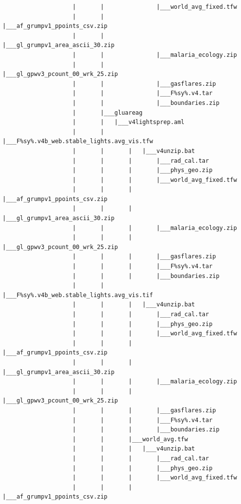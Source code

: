 \documentclass[
]{book}
\begin{document}
\begin{verbatim}
                    |       |               |___world_avg_fixed.tfw
                    |       |               |___af_grumpv1_ppoints_csv.zip
                    |       |               |___gl_grumpv1_area_ascii_30.zip
                    |       |               |___malaria_ecology.zip
                    |       |               |___gl_gpwv3_pcount_00_wrk_25.zip
                    |       |               |___gasflares.zip
                    |       |               |___F%sy%.v4.tar
                    |       |               |___boundaries.zip
                    |       |___gluareag
                    |       |   |___v4lightsprep.aml
                    |       |       |___F%sy%.v4b_web.stable_lights.avg_vis.tfw
                    |       |       |   |___v4unzip.bat
                    |       |       |       |___rad_cal.tar
                    |       |       |       |___phys_geo.zip
                    |       |       |       |___world_avg_fixed.tfw
                    |       |       |       |___af_grumpv1_ppoints_csv.zip
                    |       |       |       |___gl_grumpv1_area_ascii_30.zip
                    |       |       |       |___malaria_ecology.zip
                    |       |       |       |___gl_gpwv3_pcount_00_wrk_25.zip
                    |       |       |       |___gasflares.zip
                    |       |       |       |___F%sy%.v4.tar
                    |       |       |       |___boundaries.zip
                    |       |       |___F%sy%.v4b_web.stable_lights.avg_vis.tif
                    |       |       |   |___v4unzip.bat
                    |       |       |       |___rad_cal.tar
                    |       |       |       |___phys_geo.zip
                    |       |       |       |___world_avg_fixed.tfw
                    |       |       |       |___af_grumpv1_ppoints_csv.zip
                    |       |       |       |___gl_grumpv1_area_ascii_30.zip
                    |       |       |       |___malaria_ecology.zip
                    |       |       |       |___gl_gpwv3_pcount_00_wrk_25.zip
                    |       |       |       |___gasflares.zip
                    |       |       |       |___F%sy%.v4.tar
                    |       |       |       |___boundaries.zip
                    |       |       |___world_avg.tfw
                    |       |       |   |___v4unzip.bat
                    |       |       |       |___rad_cal.tar
                    |       |       |       |___phys_geo.zip
                    |       |       |       |___world_avg_fixed.tfw
                    |       |       |       |___af_grumpv1_ppoints_csv.zip

\end{verbatim}
\end{document}
